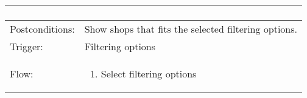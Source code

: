 \begin{longtable}{| p{3.5cm} | p{9cm} |}
\begin{enumerate}
\end{enumerate}\\
\hline
Postconditions: & Show shops that fits the selected filtering options. \\
\hline
Trigger: & Filtering options\\
\hline
Flow: &\mbox{}\par\vspace{-\baselineskip}
\begin{enumerate}
\item Select filtering options
\end{enumerate}\\
\hline
\end{longtable}






